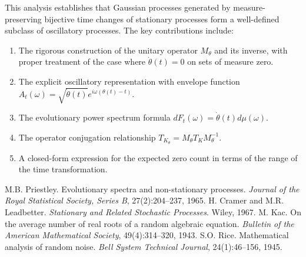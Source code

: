 \documentclass{article}
\begin{document}
This analysis establishes that Gaussian processes generated by
measure-preserving bijective time changes of stationary processes form a
well-defined subclass of oscillatory processes. The key contributions include:
\begin{enumerate}
\item The rigorous construction of the unitary operator $M_{\theta}$ and its
inverse, with proper treatment of the case where $\dot{\theta} (t) = 0$ on
sets of measure zero.
\item The explicit oscillatory representation with envelope function $A_t
(\omega) = \sqrt{\dot{\theta} (t)} e^{i \omega (\theta (t) - t)}$.
\item The evolutionary power spectrum formula $dF_t (\omega) = \dot{\theta}
(t) d \mu (\omega)$.
\item The operator conjugation relationship $T_{K_{\theta}} = M_{\theta} T_K
M_{\theta}^{- 1}$.
\item A closed-form expression for the expected zero count in terms of the
range of the time transformation.
\end{enumerate}

\begin{thebibliography}{99}
 M.B. Priestley. Evolutionary spectra and non-stationary processes. \textit{Journal of the Royal Statistical Society, Series B}, 27(2):204--237, 1965.
 H. Cramer and M.R. Leadbetter. \textit{Stationary and Related Stochastic Processes}. Wiley, 1967.
 M. Kac. On the average number of real roots of a random algebraic equation. \textit{Bulletin of the American Mathematical Society}, 49(4):314--320, 1943.
 S.O. Rice. Mathematical analysis of random noise. \textit{Bell System Technical Journal}, 24(1):46--156, 1945.
\end{thebibliography}
\end{document}

